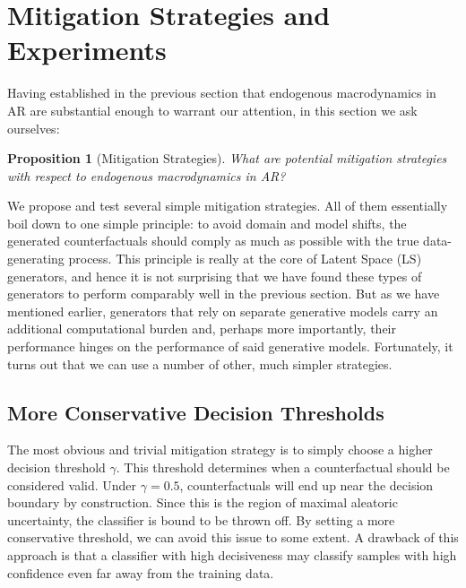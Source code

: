 \documentclass[conference,final,]{IEEEtran}
\newtheorem{proposition}{Proposition}[section]
\theoremstyle{definition}
\theoremstyle{definition}
\theoremstyle{definition}
\theoremstyle{definition}
\theoremstyle{remark}
\begin{document}
\hypertarget{mitigate}{%
\section{Mitigation Strategies and Experiments}\label{mitigate}}

Having established in the previous section that endogenous macrodynamics in AR are substantial enough to warrant our attention, in this section we ask ourselves:

\begin{proposition}[Mitigation Strategies]
\protect\hypertarget{prp:mitigate}{}\label{prp:mitigate}What are potential mitigation strategies with respect to endogenous macrodynamics in AR?
\end{proposition}

We propose and test several simple mitigation strategies. All of them essentially boil down to one simple principle: to avoid domain and model shifts, the generated counterfactuals should comply as much as possible with the true data-generating process. This principle is really at the core of Latent Space (LS) generators, and hence it is not surprising that we have found these types of generators to perform comparably well in the previous section. But as we have mentioned earlier, generators that rely on separate generative models carry an additional computational burden and, perhaps more importantly, their performance hinges on the performance of said generative models. Fortunately, it turns out that we can use a number of other, much simpler strategies.

\hypertarget{more-conservative-decision-thresholds}{%
\subsection{More Conservative Decision Thresholds}\label{more-conservative-decision-thresholds}}

The most obvious and trivial mitigation strategy is to simply choose a higher decision threshold \(\gamma\). This threshold determines when a counterfactual should be considered valid. Under \(\gamma=0.5\), counterfactuals will end up near the decision boundary by construction. Since this is the region of maximal aleatoric uncertainty, the classifier is bound to be thrown off. By setting a more conservative threshold, we can avoid this issue to some extent. A drawback of this approach is that a classifier with high decisiveness may classify samples with high confidence even far away from the training data.
\end{document}

